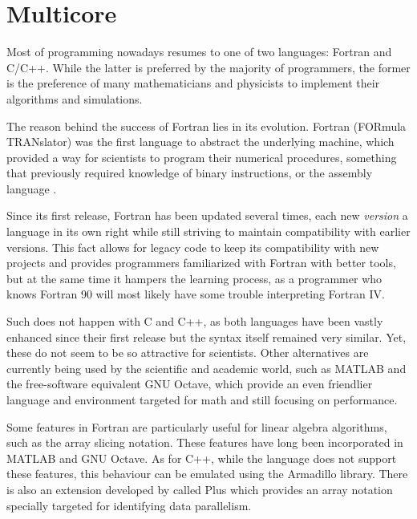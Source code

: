 \documentclass[../thesis]{subfiles}
\begin{document}
	\chapter{Multicore}
	\label{chp:multicore}

	Most of \hpc programming nowadays resumes to one of two languages: Fortran and C/C++. While the latter is preferred by the majority of programmers, the former is the preference of many mathematicians and physicists to implement their algorithms and simulations.

	The reason behind the success of Fortran lies in its evolution. Fortran (FORmula TRANslator) was the first language to abstract the underlying machine, which provided a way for scientists to program their numerical procedures, something that previously required knowledge of binary instructions, or the assembly language \cite{IBM100:Fortran}.

	Since its first release, Fortran has been updated several times, each new \textit{version} a language in its own right while still striving to maintain compatibility with earlier versions. This fact allows for legacy code to keep its compatibility with new projects and provides programmers familiarized with Fortran with better tools, but at the same time it hampers the learning process, as a programmer who knows Fortran 90 will most likely have some trouble interpreting Fortran IV.

	Such does not happen with C and C++, as both languages have been vastly enhanced since their first release but the syntax itself remained very similar. Yet, these do not seem to be so attractive for scientists. Other alternatives are currently being used by the scientific and academic world, such as MATLAB and the free-software equivalent GNU Octave, which provide an even friendlier language and environment targeted for math and still focusing on performance.

	Some features in Fortran are particularly useful for linear algebra algorithms, such as the array slicing notation. These features have long been incorporated in MATLAB and GNU Octave. As for C++, while the language does not support these features, this behaviour can be emulated using the Armadillo library. There is also an extension developed by \intel called \intel\cilk Plus which provides an array notation specially targeted for identifying data parallelism.
\end{document}
